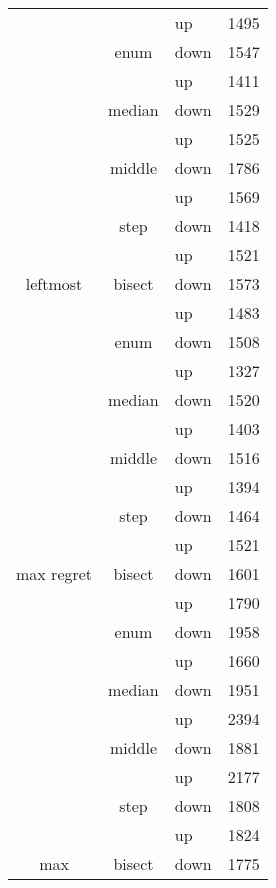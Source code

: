 \begin{longtable}{llll}
          &       & up    & 1495 \\
          & \multicolumn{1}{c}{enum} & down  & 1547 \\
          &       & up    & 1411 \\
          & \multicolumn{1}{c}{median} & down  & 1529 \\
          &       & up    & 1525 \\
          & \multicolumn{1}{c}{middle} & down  & 1786 \\
          &       & up    & 1569 \\
          & \multicolumn{1}{c}{step} & down  & 1418 \\
          &       & up    & 1521 \\
    \multicolumn{1}{c}{leftmost} & \multicolumn{1}{c}{bisect} & down  & 1573 \\
          &       & up    & 1483 \\
          & \multicolumn{1}{c}{enum} & down  & 1508 \\
          &       & up    & 1327 \\
          & \multicolumn{1}{c}{median} & down  & 1520 \\
          &       & up    & 1403 \\
          & \multicolumn{1}{c}{middle} & down  & 1516 \\
          &       & up    & 1394 \\
          & \multicolumn{1}{c}{step} & down  & 1464 \\
          &       & up    & 1521 \\
    \multicolumn{1}{c}{max regret} & \multicolumn{1}{c}{bisect} & down  & 1601 \\ \hline
          &       & up    & 1790 \\
          & \multicolumn{1}{c}{enum} & down  & 1958 \\
          &       & up    & 1660 \\
          & \multicolumn{1}{c}{median} & down  & 1951 \\
          &       & up    & 2394 \\
          & \multicolumn{1}{c}{middle} & down  & 1881 \\
          &       & up    & 2177 \\
          & \multicolumn{1}{c}{step} & down  & 1808 \\
          &       & up    & 1824 \\ \hline
    \multicolumn{1}{c}{max} & \multicolumn{1}{c}{bisect} & down  & 1775 \\

\end{longtable}
